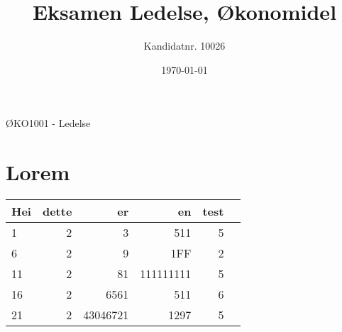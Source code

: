 \documentclass[a4paper, 12pt]{article}  %
\title{Eksamen Ledelse, Økonomidel}      %
\author{Kandidatnr. 10026}              %
\date{\today}                           %
\begin{document}
\maketitle
\vfill
\begin{center}
  ØKO1001 - Ledelse
\end{center}
\thispagestyle{empty}
\addtocounter{page}{-1}
\newpage
\section{Lorem}

\begin{table}[!htp]
  \centering
  \begin{tabular}{lrrrrr}
  \toprule
  Hei &dette &er &en &test \\
  \midrule
  1 &2 &3 &511 &5 \\
  6 &2 &9 &1FF &2 \\
  11 &2 &81 &111111111 &5 \\
  16 &2 &6561 &511 &6 \\
  21 &2 &43046721 &1297 &5 \\
  \bottomrule
  \end{tabular}
  \end{table}

\parencite{berg19}

\newpage
\printbibliography[heading=bibintoc] %
\end{document}
